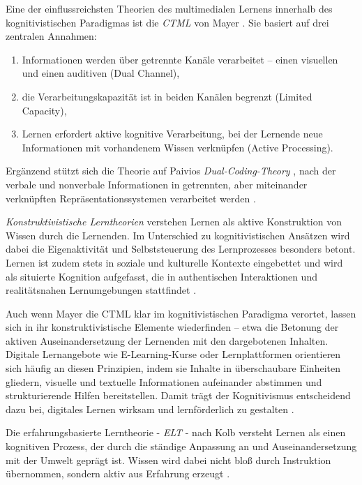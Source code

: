 Eine der einflussreichsten Theorien des multimedialen Lernens innerhalb des kognitivistischen Paradigmas ist die \textit{\ac{CTML}} von Mayer \parencite[S.~102ff]{mayer_multimedia_2001}. Sie basiert auf drei zentralen Annahmen:
\begin{enumerate}
	\item Informationen werden über getrennte Kanäle verarbeitet – einen visuellen und einen auditiven (Dual Channel),
	\item die Verarbeitungskapazität ist in beiden Kanälen begrenzt (Limited Capacity),
	\item Lernen erfordert aktive kognitive Verarbeitung, bei der Lernende neue Informationen mit vorhandenem Wissen verknüpfen (Active Processing).
\end{enumerate}

Ergänzend stützt sich die Theorie auf Paivios \textit{Dual-Coding-Theory} \parencite[S.~102f]{paivia_dual_2006}, nach der verbale und nonverbale Informationen in getrennten, aber miteinander verknüpften Repräsentationssystemen verarbeitet werden \parencite[S.~66f]{furstenau_lehr-lern-theorien_2019}.

\textit{Konstruktivistische Lerntheorien} verstehen Lernen als aktive Konstruktion von Wissen durch die Lernenden. Im Unterschied zu kognitivistischen Ansätzen wird dabei die Eigenaktivität und Selbststeuerung des Lernprozesses besonders betont. Lernen ist zudem stets in soziale und kulturelle Kontexte eingebettet und wird als situierte Kognition aufgefasst, die in authentischen Interaktionen und realitätsnahen Lernumgebungen stattfindet \parencite[S.~1f]{furstenau_lehr-lern-theorien_2019}.

Auch wenn Mayer die \ac{CTML} klar im kognitivistischen Paradigma verortet, lassen sich in ihr konstruktivistische Elemente wiederfinden – etwa die Betonung der aktiven Auseinandersetzung der Lernenden mit den dargebotenen Inhalten. Digitale Lernangebote wie E-Learning-Kurse oder Lernplattformen orientieren sich häufig an diesen Prinzipien, indem sie Inhalte in überschaubare Einheiten gliedern, visuelle und textuelle Informationen aufeinander abstimmen und strukturierende Hilfen bereitstellen. Damit trägt der Kognitivismus entscheidend dazu bei, digitales Lernen wirksam und lernförderlich zu gestalten \parencites[S.~105f]{mayer_multimedia_2001}{mayer_mayers_nodate}.

Die erfahrungsbasierte Lerntheorie - \textit{\ac{ELT}} - nach Kolb versteht Lernen als einen kognitiven Prozess, der durch die ständige Anpassung an und Auseinandersetzung mit der Umwelt geprägt ist. Wissen wird dabei nicht bloß durch Instruktion übernommen, sondern aktiv aus Erfahrung erzeugt \parencite[S.~30]{bergsteiner_kolbs_2010}.


